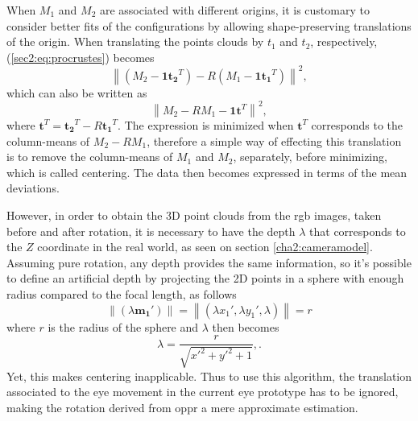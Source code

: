 When $M_1$ and $M_2$ are associated with different origins, it is customary to consider  better fits of the configurations by allowing shape-preserving translations of the origin.
When translating the points clouds by $t_1$ and $t_2$, respectively, (\ref{sec2:eq:procrustes}) becomes
\begin{equation}
\label{sec2:eq:strans1}
\left \|(M_2 - \mathbf{1} \mathbf{t_2}^T) - R(M_1 - \mathbf{1} \mathbf{t_1}^T)\right \|^2,
\end{equation}
which can also be written as
\begin{equation}
\label{sec2:eq:strans2}
\left \| M_2  - RM_1 - \mathbf{1} \mathbf{t}^T\right \|^2,
\end{equation}
where $\mathbf{t}^T = \mathbf{t_2}^T - R\mathbf{t_1}^T$. The expression is minimized when $\mathbf{t}^T$ corresponds to the column-means of $M_2 - RM_1$, therefore a simple way of effecting this translation is to remove the column-means of $M_1$ and $M_2$, separately, before minimizing, which is called centering. The data then becomes expressed in terms of the mean deviations. \cite{procrustes} 

However, in order to obtain the 3D point clouds from the \acrshort{rgb} images, taken before and after rotation, it is necessary to have the depth $\lambda$ that corresponds to the $Z$ coordinate in the real world, as seen on section \ref{cha2:cameramodel}. Assuming pure rotation, any depth provides the same information, so it's possible to define an artificial depth by projecting the 2D points in a sphere with enough radius compared to the focal length, as follows
\begin{equation}
	\label{cha2:sec3:eq:spherepro}
	\left \| (\lambda \mathbf{m_1'})  \right \| = \left \| (\lambda x_1', \lambda y_1', \lambda)  \right \| = r
\end{equation}
where $r$ is the radius of the sphere and $\lambda$ then becomes
\begin{equation}
	\label{cha2:sec3:eq:lamdba}
	\lambda = \frac{r}{\sqrt{x'^2 + y'^2 + 1}},.
\end{equation}
Yet, this makes centering inapplicable. Thus to use this algorithm, the translation associated to the eye movement in the current eye prototype has to be ignored, making the rotation derived from \acrshort{oppr} a mere approximate estimation.
